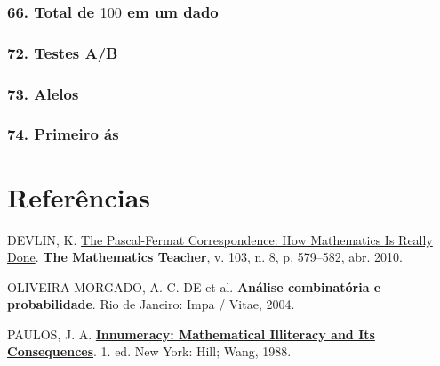 \documentclass[
  11pt]{report}
\newlength{\cslhangindent}
\newlength{\cslentryspacingunit} %
\newenvironment{CSLReferences}[2] %
 {%
  \setlength{\parindent}{0pt}
  \ifodd #1
  \let\oldpar\par
  \def\par{\hangindent=\cslhangindent\oldpar}
  \fi
  \setlength{\parskip}{#2\cslentryspacingunit}
 }%
 {}
\begin{document}
\hypertarget{total-de-100-em-um-dado}{%
\subsection*{\texorpdfstring{66. Total de $100$ em um dado}{66. Total de  em um dado}}\label{total-de-100-em-um-dado}}

\hypertarget{testes-ab}{%
\subsection*{72. Testes A/B}\label{testes-ab}}

\hypertarget{alelos}{%
\subsection*{73. Alelos}\label{alelos}}

\hypertarget{primeiro-uxe1s}{%
\subsection*{74. Primeiro ás}\label{primeiro-uxe1s}}

\hypertarget{referuxeancias}{%
\chapter*{Referências}\label{referuxeancias}}

\hypertarget{refs}{}
\begin{CSLReferences}{0}{1}
\leavevmode{}%
DEVLIN, K. \href{https://doi.org/10.5951/mt.103.8.0579}{The {P}ascal-{F}ermat Correspondence: How Mathematics Is Really Done}. \textbf{The Mathematics Teacher}, v. 103, n. 8, p. 579--582, abr. 2010.

\leavevmode{}%
OLIVEIRA MORGADO, A. C. DE et al. \textbf{An{á}lise combinat{ó}ria e probabilidade}. Rio de Janeiro: Impa / Vitae, 2004.

\leavevmode{}%
PAULOS, J. A. \textbf{\href{http://gen.lib.rus.ec/book/index.php?md5=20A842C0E7EB7F8992EDDA0082E9B76F}{Innumeracy: Mathematical Illiteracy and Its Consequences}}. 1. ed. New York: Hill; Wang, 1988.

\end{CSLReferences}
\end{document}
